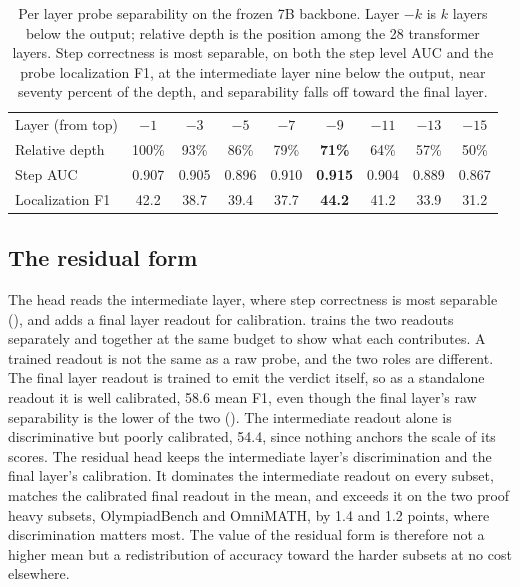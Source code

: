 \begin{table}[t]
  \centering
  \caption{Per layer probe separability on the frozen 7B backbone. Layer $-k$ is $k$ layers below the output; relative depth is the position among the 28 transformer layers. Step correctness is most separable, on both the step level AUC and the probe localization F1, at the intermediate layer nine below the output, near seventy percent of the depth, and separability falls off toward the final layer.}
  \label{tab:layersweep}
  \begin{tabular}{lcccccccc}
    \toprule
    Layer (from top) & $-1$ & $-3$ & $-5$ & $-7$ & $-9$ & $-11$ & $-13$ & $-15$ \\
    Relative depth & 100\% & 93\% & 86\% & 79\% & \textbf{71\%} & 64\% & 57\% & 50\% \\
    \midrule
    Step AUC        & 0.907 & 0.905 & 0.896 & 0.910 & \textbf{0.915} & 0.904 & 0.889 & 0.867 \\
    Localization F1 & 42.2 & 38.7 & 39.4 & 37.7 & \textbf{44.2} & 41.2 & 33.9 & 31.2 \\
    \bottomrule
  \end{tabular}
\end{table}

\subsection{The residual form}
\label{sec:exp-ablation}

The head reads the intermediate layer, where step correctness is most separable (), and adds a final layer readout for calibration.  trains the two readouts separately and together at the same budget to show what each contributes. A trained readout is not the same as a raw probe, and the two roles are different. The final layer readout is trained to emit the verdict itself, so as a standalone readout it is well calibrated, 58.6 mean F1, even though the final layer's raw separability is the lower of the two (). The intermediate readout alone is discriminative but poorly calibrated, 54.4, since nothing anchors the scale of its scores. The residual head keeps the intermediate layer's discrimination and the final layer's calibration. It dominates the intermediate readout on every subset, matches the calibrated final readout in the mean, and exceeds it on the two proof heavy subsets, OlympiadBench and OmniMATH, by 1.4 and 1.2 points, where discrimination matters most. The value of the residual form is therefore not a higher mean but a redistribution of accuracy toward the harder subsets at no cost elsewhere.

